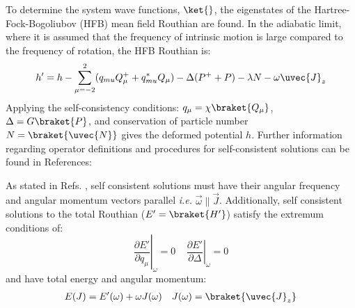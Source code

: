 To determine the system wave functions,  $\ket{}$, the eigenstates of the Hartree-Fock-Bogoliubov (HFB) mean field Routhian are found. In the adiabatic limit, where it is assumed that the frequency of intrinsic motion is large compared to the frequency of rotation, the HFB Routhian is:
\begin{equation}
\label{eqn:chp2-TAC-HFB-Routhian}
h'=h - \sum\limits_{\mu=-2}^{2}(q_{mu}Q^+_{\mu}+q^*_{mu}Q_{\mu}) - \Delta(P^++P) - \lambda{}N-\omega\uvec{J}_z
\end{equation}
Applying the self-consistency conditions: $q_{\mu}=\chi{}\braket{Q_{\mu}}$, $\Delta=G\braket{P}$, and conservation of particle number $N=\braket{\uvec{N}}$ gives the deformed potential $h$. Further information regarding operator definitions and procedures for self-consistent solutions can be found in References: \cite{frauendorfTACMultiQPBands,frauendorfTAC,nuclearManyBodyProblem}

As stated in Refs. \cite{frauendorfTACMultiQPBands,timeDepVarMethodForRotation}, self consistent solutions must have their angular frequency and angular momentum vectors parallel \emph{i.e.} $\vec{\omega}\parallel\vec{J}$. Additionally, self consistent solutions to the total Routhian ($E'=\braket{H'}$) satisfy the extremum conditions of:
\begin{equation}
\label{eqn:chp2-tac-extrema-cond}
\left. \frac{\partial{}E'}{\partial{}q_{\mu}} \right|_{\omega}=0 ~~~~~ \left. \frac{\partial{}E'}{\partial{}\Delta} \right|_{\omega}=0
\end{equation}
and have total energy and angular momentum:
\begin{align}
E(J)=E'(\omega)+\omega{}J(\omega) & & J(\omega) = \braket{\uvec{J}_z}
\end{align}

